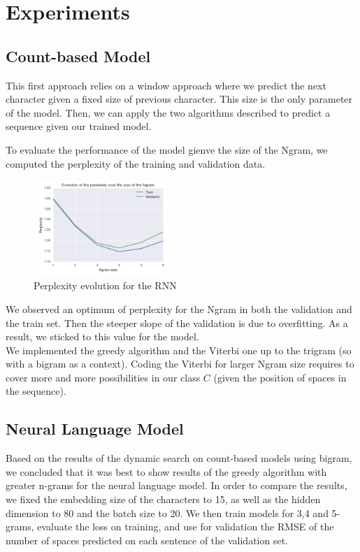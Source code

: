 \documentclass[11pt]{article}
\begin{document}
\section{Experiments}

\subsection{Count-based Model}

This first approach relies on a window approach where we predict the next character given a fixed size of previous character. This size is the only parameter of the model. Then, we can apply the two algorithms described to predict a sequence given our trained model. 

To evaluate the performance of the model gienve the size of the Ngram, we computed the perplexity of the training and validation data.

\begin{figure}[H]
\begin{center}
    \includegraphics[width=0.45\textwidth]{count_graph.png}
    \caption{Perplexity evolution for the RNN}
\end{center}
\end{figure}

We observed an optimum of perplexity for the Ngram in both the validation and the train set. Then the steeper slope of the validation is due to overfitting. As a result, we sticked to this value for the model.\\

We implemented the greedy algorithm and the Viterbi one up to the trigram (so with a bigram as a context). Coding the Viterbi for larger Ngram size requires to cover more and more possibilities in our class $C$ (given the position of spaces in the sequence). 


\subsection{Neural Language Model}

Based on the results of the dynamic search on count-based models using bigram, we concluded that it was best to show results of the greedy algorithm with greater n-grams for the neural language model. In order to compare the results, we fixed the embedding size of the characters to 15, as well as the hidden dimension to 80 and the batch size to 20. We then train models for 3,4 and 5-grams, evaluate the loss on training, and use for validation the RMSE of the number of spaces predicted on each sentence of the validation set.\\
\end{document}
